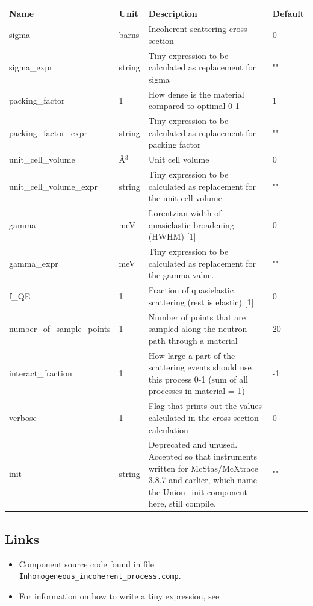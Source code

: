 \begin{longtable}{p{}p{}p{}p{}}
\toprule
\textbf{Name} & \textbf{Unit} & \textbf{Description} & \textbf{Default} \\
\midrule
\endhead
sigma & barns & Incoherent scattering cross section & 0 \\
sigma\_expr & string & Tiny expression to be calculated as replacement for sigma & "" \\
packing\_factor & 1 & How dense is the material compared to optimal 0-1 & 1 \\
packing\_factor\_expr & string & Tiny expression to be calculated as replacement for packing factor & "" \\
unit\_cell\_volume & \AA{}$^{3}$ & Unit cell volume & 0 \\
unit\_cell\_volume\_expr & string & Tiny expression to be calculated as replacement for the unit cell volume & "" \\
gamma & meV & Lorentzian width of quasielastic broadening (HWHM) [1] & 0 \\
gamma\_expr & meV & Tiny expression to be calculated as replacement for the gamma value. & "" \\
f\_QE & 1 & Fraction of quasielastic scattering (rest is elastic) [1] & 0 \\
number\_of\_sample\_points & 1 & Number of points that are sampled along the neutron path through a material & 20 \\
interact\_fraction & 1 & How large a part of the scattering events should use this process 0-1 (sum of all processes in material = 1) & -1 \\
verbose & 1 & Flag that prints out the values calculated in the cross section calculation & 0 \\
init & string & Deprecated and unused. Accepted so that instruments written for McStas/McXtrace 3.8.7 and earlier, which name the Union\_init component here, still compile. & "" \\
\bottomrule
\end{longtable}

\subsection*{Links}
\begin{itemize}
  \item Component source code found in file \texttt{Inhomogeneous\_incoherent\_process.comp}.
  \item For information on how to write a tiny expression, see 
\end{itemize}
